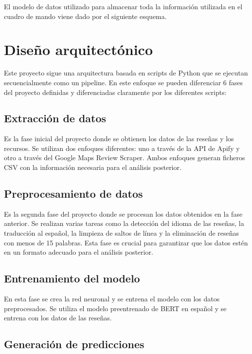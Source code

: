 El modelo de datos utilizado para almacenar toda la información utilizada en el cuadro de mando viene dado por el siguiente esquema.


\section{Diseño arquitectónico}

Este proyecto sigue una arquitectura basada en scripts de Python que se ejecutan secuencialmente como un pipeline.
En este enfoque se pueden diferenciar 6 fases del proyecto definidas y diferenciadas claramente por los diferentes scripts:

\subsection{Extracción de datos}

Es la fase inicial del proyecto donde se obtienen los datos de las reseñas y los recursos. 
Se utilizan dos enfoques diferentes: uno a través de la API de Apify y otro a través del Google Maps Review Scraper.
Ambos enfoques generan ficheros CSV con la información necesaria para el análisis posterior.

\subsection{Preprocesamiento de datos}

Es la segunda fase del proyecto donde se procesan los datos obtenidos en la fase anterior.
Se realizan varias tareas como la detección del idioma de las reseñas, la traducción al español, la limpieza de saltos de línea y la eliminación de reseñas con menos de 15 palabras.
Esta fase es crucial para garantizar que los datos estén en un formato adecuado para el análisis posterior.

\subsection{Entrenamiento del modelo}

En esta fase se crea la red neuronal y se entrena el modelo con los datos preprocesados. 
Se utiliza el modelo preentrenado de BERT en español y se entrena con los datos de las reseñas.

\subsection{Generación de predicciones}

